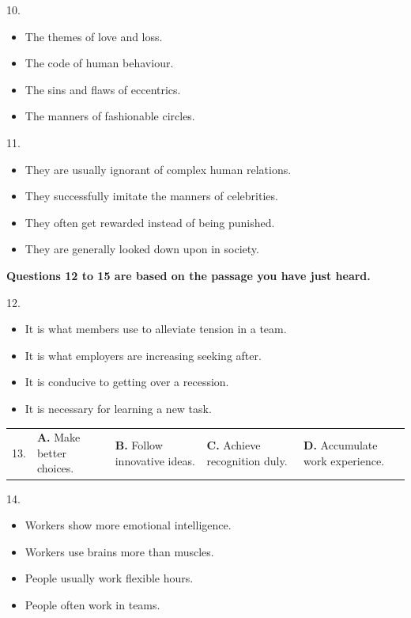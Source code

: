 \documentclass[UTF8,11pt]{ctexart}
\begin{document}
10.


\begin{itemize}[leftmargin=2em,itemsep=.2em,topsep=.4em]\item[A.] The themes of love and loss.
\item[B.] The code of human behaviour.
\item[C.] The sins and flaws of eccentrics.
\item[D.] The manners of fashionable circles.
\end{itemize}

11.


\begin{itemize}[leftmargin=2em,itemsep=.2em,topsep=.4em]\item[A.] They are usually ignorant of complex human relations.
\item[B.] They successfully imitate the manners of celebrities.
\item[C.] They often get rewarded instead of being punished.
\item[D.] They are generally looked down upon in society.
\end{itemize}

\textbf{Questions 12 to 15 are based on the passage you have just heard.}


12.


\begin{itemize}[leftmargin=2em,itemsep=.2em,topsep=.4em]\item[A.] It is what members use to alleviate tension in a team.
\item[B.] It is what employers are increasing seeking after.
\item[C.] It is conducive to getting over a recession.
\item[D.] It is necessary for learning a new task.
\end{itemize}

\noindent\begin{tabularx}{\linewidth}{@{}lXXXX@{}}13. & \textbf{A.} Make better choices. & \textbf{B.} Follow innovative ideas. & \textbf{C.} Achieve recognition duly. & \textbf{D.} Accumulate work experience.\\\end{tabularx}\par

14.


\begin{itemize}[leftmargin=2em,itemsep=.2em,topsep=.4em]\item[A.] Workers show more emotional intelligence.
\item[B.] Workers use brains more than muscles.
\item[C.] People usually work flexible hours.
\item[D.] People often work in teams.
\end{itemize}
\end{document}
